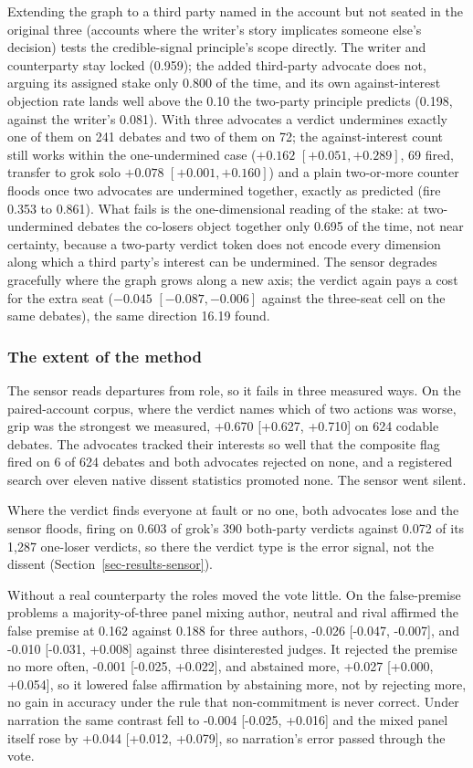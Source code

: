 Extending the graph to a third party named in the account but not seated
in the original three (accounts where the writer's story implicates
someone else's decision) tests the credible-signal principle's scope
directly. The writer and counterparty stay locked (0.959); the added
third-party advocate does not, arguing its assigned stake only 0.800 of
the time, and its own against-interest objection rate lands well above
the 0.10 the two-party principle predicts (0.198, against the writer's
0.081). With three advocates a verdict undermines exactly one of them on
241 debates and two of them on 72; the against-interest count still works
within the one-undermined case ($+0.162$ $[+0.051, +0.289]$, 69 fired,
transfer to grok solo $+0.078$ $[+0.001, +0.160]$) and a plain two-or-more
counter floods once two advocates are undermined together, exactly as
predicted (fire 0.353 to 0.861).
What fails is the one-dimensional reading of the stake: at two-undermined
debates the co-losers object together only 0.695 of the time, not near
certainty, because a two-party verdict token does not encode every
dimension along which a third party's interest can be undermined. The
sensor degrades gracefully where the graph grows along a new axis; the
verdict again pays a cost for the extra seat ($-0.045$ $[-0.087, -0.006]$
against the three-seat cell on the same debates), the same direction 16.19
found.

\subsubsection{The extent of the method}
\label{sec-results-extent}

The sensor reads departures from role, so it fails in three measured ways. On
the paired-account corpus, where the verdict names which of two actions was
worse, grip was the strongest we measured, +0.670 [+0.627, +0.710] on
624 codable debates.
The advocates tracked their interests so well that the composite flag fired
on 6 of 624 debates and both advocates rejected on none,
and a registered search over eleven native dissent statistics promoted
none.
The sensor went silent.

Where the verdict finds everyone at fault or no one, both advocates lose and
the sensor floods, firing on 0.603 of grok's 390 both-party verdicts
against 0.072 of its 1,287 one-loser verdicts, so there the verdict type
is the error signal, not the dissent (Section~\ref{sec-results-sensor}).

Without a real counterparty the roles moved the vote little. On the
false-premise problems a majority-of-three panel mixing author, neutral and
rival affirmed the false premise at 0.162 against 0.188 for three
authors, -0.026 [-0.047, -0.007], and -0.010 [-0.031, +0.008] against
three disinterested judges.
It rejected the premise no more often, -0.001 [-0.025, +0.022], and
abstained more, +0.027 [+0.000, +0.054], so it lowered false affirmation
by abstaining more, not by rejecting more, no gain in accuracy under the
rule that non-commitment is never correct.
Under narration the same contrast fell to -0.004 [-0.025, +0.016] and the
mixed panel itself rose by +0.044 [+0.012, +0.079], so narration's error
passed through the vote.

